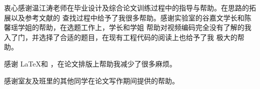 \begin{acknowledgement}
  衷心感谢温江涛老师在毕业设计及综合论文训练过程中的指导与帮助。在思路的拓展以及参考文献的
  查找过程中给予了我很多帮助。感谢实验室的谷嘉文学长和陈馨瑶学姐的帮助，在选题工作上，学长和学姐
  帮助对视频编码完全没有了解的我入了门，并选择了合适的题目，在现有工程代码的阅读上也给予了我
  极大的帮助。

  感谢 \LaTeX 和 \thuthesis\cite{thuthesis}，在论文排版上帮助我减少了很多麻烦。

  感谢室友及班里的其他同学在论文写作期间提供的帮助。
  
\end{acknowledgement}

